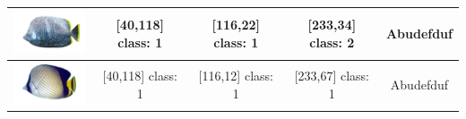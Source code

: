 \begin{longtable}{|c|c|c|c|c|}
	\includegraphics[width=3cm]{gambar/dataset_validasi/Chaetodon24} & [40,118] class: 1 & [116,22] class: 1 & [233,34] class: 2 & Abudefduf \\ \hline
	\includegraphics[width=3cm]{gambar/dataset_validasi/Chaetodon25} & [40,118] class: 1 & [116,12] class: 1 & [233,67] class: 1 & Abudefduf \\ \hline

	
  \end{longtable}